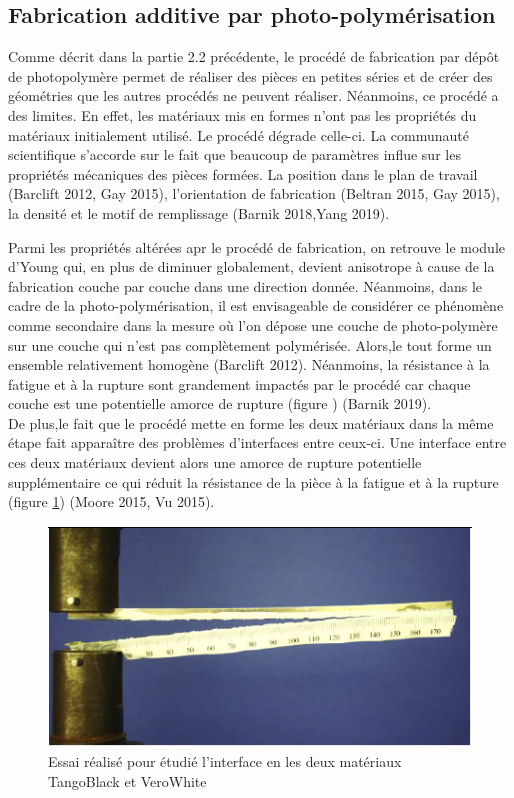 \documentclass[10pt, a4paper]{article}
\begin{document}
    \subsection{Fabrication additive par photo-polymérisation}
    \qquad Comme décrit dans la partie 2.2 précédente, le procédé de fabrication par dépôt de photopolymère permet de réaliser des pièces en petites séries et de créer des géométries que les autres procédés ne peuvent réaliser. Néanmoins, ce procédé a des limites. En effet, les matériaux mis en formes n'ont pas les propriétés du matériaux initialement utilisé. Le procédé dégrade celle-ci. La communauté scientifique s'accorde sur le fait que beaucoup de paramètres influe sur les propriétés mécaniques des pièces formées. La position dans le plan de travail (Barclift 2012, Gay 2015), l'orientation de fabrication (Beltran 2015, Gay 2015), la densité et le motif de remplissage (Barnik 2018,Yang 2019). \newline\newline
    
    \quad  Parmi les propriétés altérées apr le procédé de fabrication, on retrouve le module d'Young qui, en plus de diminuer globalement, devient anisotrope à cause de la fabrication couche par couche dans une direction donnée. Néanmoins, dans le cadre de la photo-polymérisation, il est envisageable de considérer ce phénomène comme secondaire dans la mesure où l'on dépose une couche de photo-polymère sur une couche qui n'est pas complètement polymérisée. Alors,le tout forme un ensemble relativement homogène (Barclift 2012). Néanmoins, la résistance à la fatigue et à la rupture sont grandement impactés par le procédé car chaque couche est une potentielle amorce de rupture (figure ) (Barnik 2019). \\
    
   \quad De plus,le fait que le procédé mette en forme les deux matériaux dans la même étape fait apparaître des problèmes d'interfaces entre ceux-ci. Une interface entre ces deux matériaux devient alors une amorce de rupture potentielle supplémentaire ce qui réduit la résistance de la pièce à la fatigue et à la rupture (figure \ref{fig:essai}) (Moore 2015, Vu 2015). 
    
\begin{figure}[ht!]
\centering
\includegraphics[scale=1]{ImageIntro/EssaiInterfaceTBVW.PNG}
\caption{ Essai réalisé pour étudié l'interface en les deux matériaux TangoBlack et VeroWhite }
\label{fig:essai}
\end{figure}
    
\end{document}
